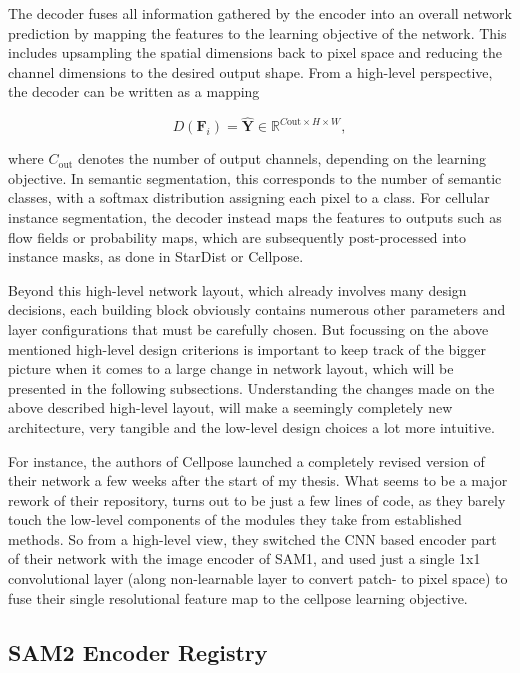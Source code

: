 The decoder fuses all information gathered by the encoder into an overall network prediction by mapping the features to the learning objective of the network. This includes upsampling the spatial dimensions back to pixel space and reducing the channel dimensions to the desired output shape. From a high-level perspective, the decoder can be written as a mapping

\begin{equation}
D({\mathbf{F}_i}) = \hat{\mathbf{Y}} \in \mathbb{R}^{C\text{out} \times H \times W},
\end{equation}

where $C_\text{out}$ denotes the number of output channels, depending on the learning objective. In semantic segmentation, this corresponds to the number of semantic classes, with a softmax distribution assigning each pixel to a class. For cellular instance segmentation, the decoder instead maps the features to outputs such as flow fields or probability maps, which are subsequently post-processed into instance masks, as done in StarDist or Cellpose.

Beyond this high-level network layout, which already involves many design decisions, each building block obviously contains numerous other parameters and layer configurations that must be carefully chosen. But focussing on the above mentioned high-level design criterions is important to keep track of the bigger picture when it comes to a large change in network layout, which will be presented in the following subsections. Understanding the changes made on the above described high-level layout, will make a seemingly completely new architecture, very tangible and the low-level design choices a lot more intuitive.

For instance, the authors of Cellpose launched a completely revised version of their network a few weeks after the start of my thesis. What seems to be a major rework of their repository, turns out to be just a few lines of code, as they barely touch the low-level components of the modules they take from established methods. So from a high-level view, they switched the CNN based encoder part of their network with the image encoder of SAM1, and used just a single 1x1 convolutional layer (along non-learnable layer to convert patch- to pixel space) to fuse their single resolutional feature map to the cellpose learning objective.



\subsection{SAM2 Encoder Registry}

